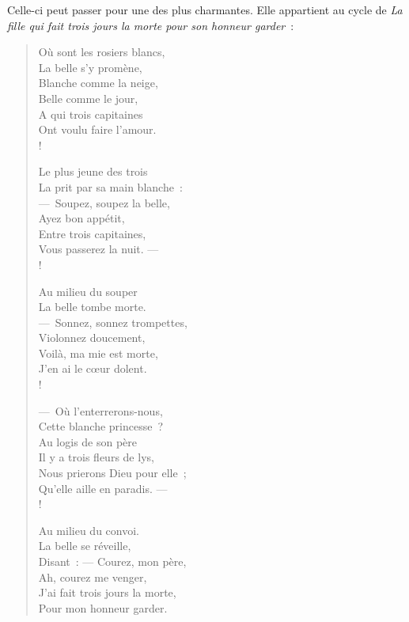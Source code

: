 \documentclass[french,twoside]{book} %
\begin{document}
\noindent Celle-ci peut passer pour une des plus charmantes. Elle appartient au cycle de {\itshape La fille qui fait trois jours la morte pour son honneur garder} :\par


\begin{verse}
Où sont les rosiers blancs,\\
La belle s’y promène,\\
Blanche comme la neige,\\
Belle comme le jour,\\
A qui trois capitaines\\
Ont voulu faire l’amour.\\!

Le plus jeune des trois\\
La prit par sa main blanche :\\
— Soupez, soupez la belle,\\
Ayez bon appétit,\\
Entre trois capitaines,\\
Vous passerez la nuit. — \\!

Au milieu du souper\\
La belle tombe morte.\\
— Sonnez, sonnez trompettes,\\
Violonnez doucement,\\
Voilà, ma mie est morte,\\
J’en ai le cœur dolent.\\!

— Où l’enterrerons-nous,\\
Cette blanche princesse ?\\
Au logis de son père\\
Il y a trois fleurs de lys,\\
Nous prierons Dieu pour elle ;\\
Qu’elle aille en paradis. — \\!

Au milieu du convoi.\\
La belle se réveille,\\
Disant : — Courez, mon père,\\
Ah, courez me venger,\\
J’ai fait trois jours la morte,\\
Pour mon honneur garder.\\
\end{verse}
\end{document}
